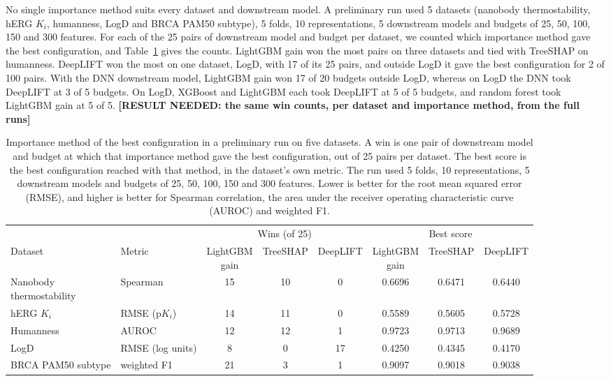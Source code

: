 No single importance method suits every dataset and downstream model. A preliminary run used 5 datasets (nanobody thermostability, hERG $K_i$, humanness, LogD and BRCA PAM50 subtype), 5 folds, 10 representations, 5 downstream models and budgets of 25, 50, 100, 150 and 300 features. For each of the 25 pairs of downstream model and budget per dataset, we counted which importance method gave the best configuration, and Table~\ref{tab:importance_wins} gives the counts. LightGBM gain won the most pairs on three datasets and tied with TreeSHAP on humanness. DeepLIFT won the most on one dataset, LogD, with 17 of its 25 pairs, and outside LogD it gave the best configuration for 2 of 100 pairs. With the DNN downstream model, LightGBM gain won 17 of 20 budgets outside LogD, whereas on LogD the DNN took DeepLIFT at 3 of 5 budgets. On LogD, XGBoost and LightGBM each took DeepLIFT at 5 of 5 budgets, and random forest took LightGBM gain at 5 of 5. \textbf{[RESULT NEEDED: the same win counts, per dataset and importance method, from the full runs]}

\begin{table}[htbp]
\centering
\caption[Importance method of the best configuration in a preliminary run.]{Importance method of the best configuration in a preliminary run on five datasets. A win is one pair of downstream model and budget at which that importance method gave the best configuration, out of 25 pairs per dataset. The best score is the best configuration reached with that method, in the dataset's own metric. The run used 5 folds, 10 representations, 5 downstream models and budgets of 25, 50, 100, 150 and 300 features. Lower is better for the root mean squared error (RMSE), and higher is better for Spearman correlation, the area under the receiver operating characteristic curve (AUROC) and weighted F1.}
\label{tab:importance_wins}
\small
\begin{adjustbox}{max width=\textwidth}
\begin{tabular}{@{}llcccccc@{}}
\toprule
 & & \multicolumn{3}{c}{Wins (of 25)} & \multicolumn{3}{c}{Best score} \\
\cmidrule(lr){3-5}\cmidrule(lr){6-8}
Dataset & Metric & \makecell{LightGBM\\gain} & TreeSHAP & DeepLIFT & \makecell{LightGBM\\gain} & TreeSHAP & DeepLIFT \\
\midrule
\makecell[l]{Nanobody\\thermostability} & Spearman & 15 & 10 & 0 & 0.6696 & 0.6471 & 0.6440 \\
hERG $K_i$ & RMSE (p$K_i$) & 14 & 11 & 0 & 0.5589 & 0.5605 & 0.5728 \\
Humanness & AUROC & 12 & 12 & 1 & 0.9723 & 0.9713 & 0.9689 \\
LogD & RMSE (log units) & 8 & 0 & 17 & 0.4250 & 0.4345 & 0.4170 \\
BRCA PAM50 subtype & weighted F1 & 21 & 3 & 1 & 0.9097 & 0.9018 & 0.9038 \\
\bottomrule
\end{tabular}
\end{adjustbox}
\end{table}


